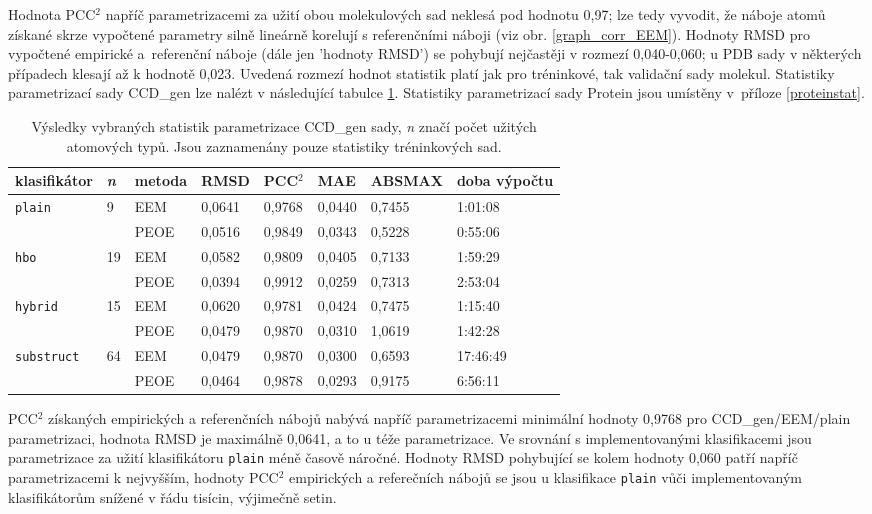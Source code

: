 Hodnota PCC$^2$ napříč parametrizacemi za užití obou molekulových sad neklesá pod hodnotu 0,97; lze tedy vyvodit, že náboje atomů získané skrze vypočtené parametry silně lineárně korelují s referenčními náboji (viz obr. \ref{graph_corr_EEM}). Hodnoty RMSD  pro vypočtené empirické a~referenční náboje (dále jen 'hodnoty RMSD') se pohybují nejčastěji v rozmezí 0,040-0,060; u PDB sady v některých případech klesají až k hodnotě 0,023. Uvedená rozmezí hodnot statistik platí jak pro tréninkové, tak validační sady molekul. Statistiky parametrizací sady CCD\_gen lze nalézt v následující tabulce \ref{statistics}. Statistiky parametrizací sady Protein jsou umístěny v~příloze \ref{proteinstat}. 
\medskip
\begin{table}[h]
    \small
    \renewcommand{\arraystretch}{1.4}
    \centering
    \begin{tabular}{l|l|l|l|l|l|l|l}
         \textbf{klasifikátor} & \textbf{\textit{n}} & \textbf{metoda} & \textbf{RMSD} & \textbf{PCC$^2$} & \textbf{MAE} & \textbf{ABSMAX} & \textbf{doba výpočtu}\\
         \hline
         \multirow{2}{6em}{\texttt{plain}} & \multirow{2}{1.5em}{ 9} & EEM & 0,0641 & 0,9768 & 0,0440 & 0,7455 & 1:01:08 \\
         & & PEOE & 0,0516 & 0,9849 & 0,0343 & 0,5228 & 0:55:06 \\
         \hline
         \multirow{2}{6em}{\texttt{hbo}} & \multirow{2}{1.5em}{19} & EEM & 0,0582 & 0,9809 & 0,0405 & 0,7133 & 1:59:29  \\
         & & PEOE & 0,0394 & 0,9912 & 0,0259 & 0,7313 & 2:53:04 \\
         \hline
         \multirow{2}{6em}{\texttt{hybrid}} & \multirow{2}{1.5em}{15} & EEM & 0,0620 & 0,9781 & 0,0424 & 0,7475 & 1:15:40 \\
         & & PEOE & 0,0479 & 0,9870 & 0,0310 & 1,0619 & 1:42:28 \\
         \hline
         \multirow{2}{6em}{\texttt{substruct}} & \multirow{2}{1.5em}{64} & EEM & 0,0479 & 0,9870 & 0,0300 & 0,6593 & 17:46:49 \\
         & & PEOE & 0,0464 & 0,9878 & 0,0293 & 0,9175 & 6:56:11 
    \end{tabular}
    \caption{Výsledky vybraných statistik parametrizace CCD\_gen sady, \textit{n} značí počet užitých atomových typů. Jsou zaznamenány pouze statistiky tréninkových sad.}
    \label{statistics}
\end{table}
\medskip
 
PCC$^2$ získaných empirických a referenčních nábojů nabývá napříč parametrizacemi minimální hodnoty 0,9768 pro CCD\_gen/EEM/plain parametrizaci, hodnota RMSD je maximálně 0,0641, a to u téže parametrizace. Ve srovnání s implementovanými klasifikacemi jsou parametrizace za užití klasifikátoru \verb|plain| méně časově náročné. Hodnoty RMSD pohybující se kolem hodnoty 0,060 patří napříč parametrizacemi k nejvyšším, hodnoty PCC$^2$ empirických a referečních nábojů se jsou u klasifikace \verb|plain| vůči implementovaným klasifikátorům snížené v řádu tisícin, výjimečně setin. 

